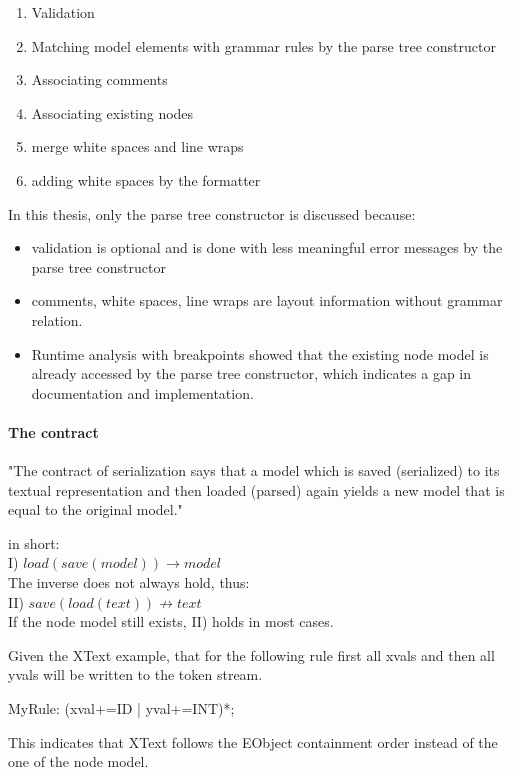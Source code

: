 \begin{enumerate}
	\item Validation
	\item Matching model elements with grammar rules by the parse tree constructor
	\item Associating comments
	\item Associating existing nodes
	\item merge white spaces and line wraps
	\item adding white spaces by the formatter
\end{enumerate}

In this thesis, only the parse tree constructor is discussed because:
\begin{itemize}
	\item validation is optional and is done with less meaningful error messages by the parse tree constructor
	\item comments, white spaces, line wraps are layout information without grammar relation.
	\item Runtime analysis with breakpoints showed that the existing node model is already accessed by the parse tree constructor, which indicates a gap in documentation and implementation.
\end{itemize}

\paragraph{The contract}
"The contract of serialization says that a model which is saved (serialized) to its textual representation and then loaded (parsed) again yields a new model that is equal to the original model."\cite{XTextMan}

in short:\\
I) $load(save(model)) \rightarrow model$\\
The inverse does not always hold, thus:\\
II) $save(load(text)) \nrightarrow text$\\
If the node model still exists, II) holds in most cases. 

Given the XText example, that for the following rule first all xvals and then all yvals will be written to the token stream.
\begin{xtxt}
MyRule: (xval+=ID | yval+=INT)*; 
\end{xtxt}
This indicates that XText follows the EObject containment order instead of the one of the node model.

